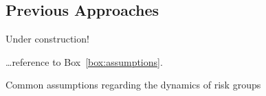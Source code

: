 \subsection{Previous Approaches}
Under construction!
\par
\dots reference to Box~\ref{box:assumptions}.
\begin{floatbox}
  \caption{Common assumptions regarding the dynamics of risk groups}
  \label{box:assumptions}
  
\end{floatbox}
\clearpage